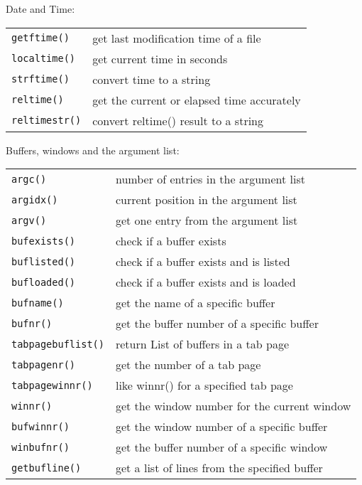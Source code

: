 Date and Time:
\label{date-functions}
\label{time-functions}
\begin{center} \begin{tabular}{l l}
				\verb!getftime()! & get last modification time of a file \\
				\verb!localtime()! & get current time in seconds \\
				\verb!strftime()! & convert time to a string \\
				\verb!reltime()! & get the current or elapsed time accurately \\
				\verb!reltimestr()! & convert reltime() result to a string \\
\end{tabular} \end{center}

Buffers, windows and the argument list:
\label{buffer-functions}
\label{window-functions}
\label{arg-functions}
\begin{center} \begin{tabular}{l l}
				\verb!argc()! & number of entries in the argument list \\
				\verb!argidx()! & current position in the argument list \\
				\verb!argv()! & get one entry from the argument list \\
				\verb!bufexists()! & check if a buffer exists \\
				\verb!buflisted()! & check if a buffer exists and is listed \\
				\verb!bufloaded()! & check if a buffer exists and is loaded \\
				\verb!bufname()! & get the name of a specific buffer \\
				\verb!bufnr()! & get the buffer number of a specific buffer \\
				\verb!tabpagebuflist()! & return List of buffers in a tab page \\
				\verb!tabpagenr()! & get the number of a tab page \\
				\verb!tabpagewinnr()! & like winnr() for a specified tab page \\
				\verb!winnr()! & get the window number for the current window \\
				\verb!bufwinnr()! & get the window number of a specific buffer \\
				\verb!winbufnr()! & get the buffer number of a specific window \\
				\verb!getbufline()! & get a list of lines from the specified buffer \\
\end{tabular} \end{center}

